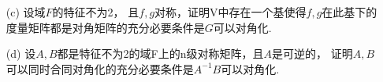 \begin{itemize}
\begin{itemize}

        \item [(c)] 设域$F$的特征不为2， 且$f,g$对称，证明V中存在一个基使得$f,g$在此基下的度量矩阵都是对角矩阵的充分必要条件是$G$可以对角化.
        \vspace{3cm}
        


        \item [(d)] 设$A,B$都是特征不为2的域F上的n级对称矩阵，且$A$是可逆的，
        证明$A,B$可以同时合同对角化的充分必要条件是$A^{-1}B$可以对角化.
        \vspace{3cm}
        
    \end{itemize} 
\end{itemize}


